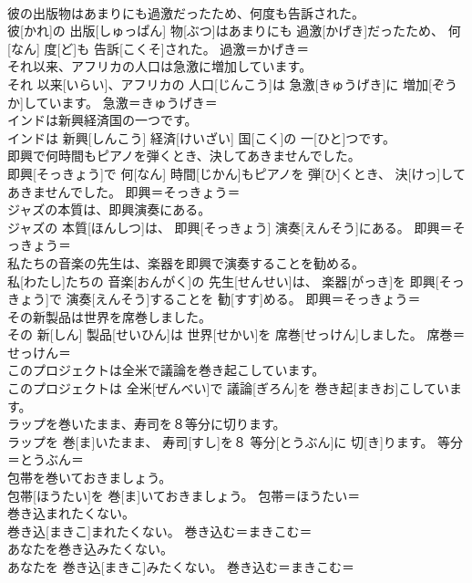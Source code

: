 \documentclass[8pt]{extreport}
\begin{document}
\begin{CJK}{UTF8}{min}
\\	彼の出版物はあまりにも過激だったため、何度も告訴された。	
\\	彼[かれ]の 出版[しゅっぱん] 物[ぶつ]はあまりにも 過激[かげき]だったため、 何[なん] 度[ど]も 告訴[こくそ]された。	過激＝かげき＝ 
\\	それ以来、アフリカの人口は急激に増加しています。	
\\	それ 以来[いらい]、アフリカの 人口[じんこう]は 急激[きゅうげき]に 増加[ぞうか]しています。	急激＝きゅうげき＝ 
\\	インドは新興経済国の一つです。	
\\	インドは 新興[しんこう] 経済[けいざい] 国[こく]の 一[ひと]つです。	
\\	即興で何時間もピアノを弾くとき、決してあきませんでした。	
\\	即興[そっきょう]で 何[なん] 時間[じかん]もピアノを 弾[ひ]くとき、 決[けっ]してあきませんでした。	即興＝そっきょう＝ 
\\	ジャズの本質は、即興演奏にある。	
\\	ジャズの 本質[ほんしつ]は、 即興[そっきょう] 演奏[えんそう]にある。	即興＝そっきょう＝ 
\\	私たちの音楽の先生は、楽器を即興で演奏することを勧める。	
\\	私[わたし]たちの 音楽[おんがく]の 先生[せんせい]は、 楽器[がっき]を 即興[そっきょう]で 演奏[えんそう]することを 勧[すす]める。	即興＝そっきょう＝ 
\\	その新製品は世界を席巻しました。	
\\	その 新[しん] 製品[せいひん]は 世界[せかい]を 席巻[せっけん]しました。	席巻＝せっけん＝ 
\\	このプロジェクトは全米で議論を巻き起こしています。	
\\	このプロジェクトは 全米[ぜんべい]で 議論[ぎろん]を 巻き起[まきお]こしています。	
\\	ラップを巻いたまま、寿司を８等分に切ります。	
\\	ラップを 巻[ま]いたまま、 寿司[すし]を８ 等分[とうぶん]に 切[き]ります。	等分＝とうぶん＝ 
\\	包帯を巻いておきましょう。	
\\	包帯[ほうたい]を 巻[ま]いておきましょう。	包帯＝ほうたい＝ 
\\	巻き込まれたくない。	
\\	巻き込[まきこ]まれたくない。	巻き込む＝まきこむ＝ 
\\	あなたを巻き込みたくない。	
\\	あなたを 巻き込[まきこ]みたくない。	巻き込む＝まきこむ＝ 

\end{CJK}
\end{document}
